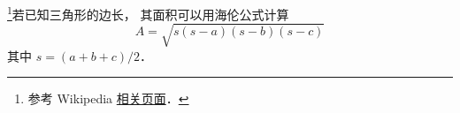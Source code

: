 
\footnote{参考 Wikipedia \href{https://en.wikipedia.org/wiki/Heron's_formula}{相关页面}．}若已知三角形的边长， 其面积可以用海伦公式计算
\begin{equation}
A = \sqrt{s(s-a)(s-b)(s-c)}
\end{equation}
其中 $s = (a+b+c)/2$．
